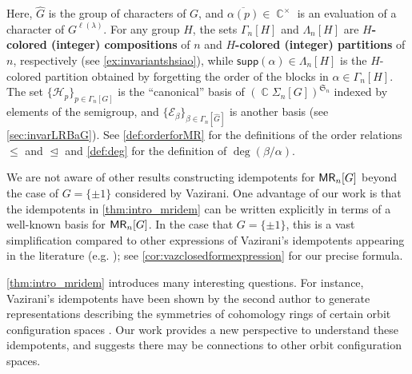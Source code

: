 \documentclass[11pt, oneside, reqno]{amsart}
\theoremstyle{definition}
\numberwithin{equation}{section}
\DeclareMathOperator{\C}{\mathbb{C}}
\newcommand{\defn}[1]{{\color{RoyalBlue}\bf#1}}
\def \MR {{\sf{MR}}}
\def \kk{\C}
\def \ol{\overline}
\def \sym{\mathfrak{S}}
\def \wh{\widehat}
\DeclareMathOperator{\chleq}{\unlhd}
\def \supp{\mathsf{supp}}
\newcommand{\SB}[1]{\mathcal{#1}} 		%
\begin{document}
Here, $\wh{G}$ is the group of characters of $G$, and $\ol{\alpha(p)} \in \C^{\times}$ is an evaluation of a character of $G^{\ell(\lambda)}$. For any group $H$, the sets $\Gamma_n[H]$ and $\Lambda_n[H]$ are \defn{$H$-colored (integer) compositions} of $n$ and \defn{$H$-colored (integer)  partitions} of $n$, respectively  (see \cref{ex:invariantshsiao}), while $\supp(\alpha) \in \Lambda_n[H]$ is the $H$-colored partition obtained by forgetting the order of the blocks in $\alpha \in \Gamma_n[H]$.
The set $\{ \SB{H}_p \}_{p \in \Gamma_n[G]}$ is the ``canonical'' basis of
$(\kk \Sigma_n[G])^{\sym_n}$ indexed by elements of the semigroup, and  $\{
\SB{E}_{\beta} \}_{\beta \in \Gamma_n[\wh{G}]}$ is another basis (see
\cref{sec:invarLRBaG}). See \cref{def:orderforMR} for the definitions
of the order relations $\leq$ and $\chleq$ and
\cref{def:deg} for the definition of $\deg(\beta/\alpha)$.

We are not aware of other results constructing idempotents for $\MR_n[G]$ beyond the case of $G =\{\pm 1\}$ considered by Vazirani. One advantage of our work is that the idempotents in \cref{thm:intro_mridem} can be written explicitly in terms of a well-known basis for $\MR_n[G]$. In the case that $G =\{\pm 1\}$, this is a vast simplification compared to other expressions of Vazirani's idempotents appearing in the literature (e.g. \cite{vazirani, DouTom2018decomposition}); see \cref{cor:vazclosedformexpression} for our precise formula.


\cref{thm:intro_mridem} introduces many interesting questions. For instance, Vazirani's idempotents have been shown by the second author to generate representations describing the symmetries of cohomology rings of certain orbit configuration spaces \cite{brauner2023type}. Our work provides a new perspective to understand these idempotents, and suggests there may be connections to other orbit configuration spaces.
\end{document}
